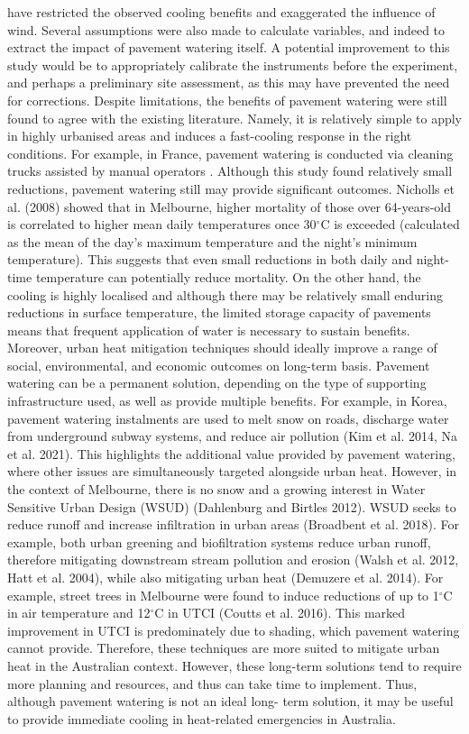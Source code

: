 \documentclass[final,3p,times,authoryear]{elsarticle}
\begin{document}
have restricted the observed cooling benefits and exaggerated the influence of wind.
Several assumptions were also made to calculate variables, and indeed to extract the
impact of pavement watering itself. A potential improvement to this study would be to
appropriately calibrate the instruments before the experiment, and perhaps a preliminary
site assessment, as this may have prevented the need for corrections.
Despite limitations, the benefits of pavement watering were still found to agree with the
existing literature. Namely, it is relatively simple to apply in highly urbanised areas and induces a fast-cooling response in the right conditions. For example, in France,
pavement watering is conducted via cleaning trucks assisted by manual operators
\citep{Hendel2014}. Although this study found relatively small reductions, pavement
watering still may provide significant outcomes. Nicholls et al. (2008) showed that in
Melbourne, higher mortality of those over 64-years-old is correlated to higher mean
daily temperatures once 30$^{\circ}$C is exceeded (calculated as the mean of the day’s
maximum temperature and the night’s minimum temperature). This suggests that even
small reductions in both daily and night-time temperature can potentially reduce
mortality.
On the other hand, the cooling is highly localised and although there may be relatively
small enduring reductions in surface temperature, the limited storage capacity of
pavements means that frequent application of water is necessary to sustain benefits.
Moreover, urban heat mitigation techniques should ideally improve a range of social,
environmental, and economic outcomes on long-term basis. Pavement watering can be a
permanent solution, depending on the type of supporting infrastructure used, as well as
provide multiple benefits. For example, in Korea, pavement watering instalments are
used to melt snow on roads, discharge water from underground subway systems, and
reduce air pollution (Kim et al. 2014, Na et al. 2021). This highlights the additional value provided by pavement watering, where other issues are simultaneously targeted
alongside urban heat.
However, in the context of Melbourne, there is no snow and a growing interest in Water
Sensitive Urban Design (WSUD) (Dahlenburg and Birtles 2012). WSUD seeks to
reduce runoff and increase infiltration in urban areas (Broadbent et al. 2018). For
example, both urban greening and biofiltration systems reduce urban runoff, therefore
mitigating downstream stream pollution and erosion (Walsh et al. 2012, Hatt et al.
2004), while also mitigating urban heat (Demuzere et al. 2014). For example, street
trees in Melbourne were found to induce reductions of up to 1$^{\circ}$C in air temperature and
12$^{\circ}$C in UTCI (Coutts et al. 2016). This marked improvement in UTCI is
predominately due to shading, which pavement watering cannot provide. Therefore,
these techniques are more suited to mitigate urban heat in the Australian context.
However, these long-term solutions tend to require more planning and resources, and
thus can take time to implement. Thus, although pavement watering is not an ideal long-
term solution, it may be useful to provide immediate cooling in heat-related
emergencies in Australia.
\end{document}
